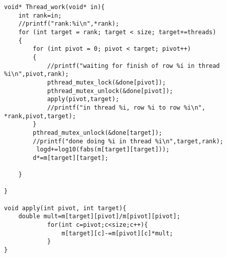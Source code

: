 \documentclass{article}
\begin{document}
\begin{lstlisting}[style=CStyle]
void* Thread_work(void* in){
    int rank=in;
    //printf("rank:%i\n",*rank);
    for (int target = rank; target < size; target+=threads)
    {
        for (int pivot = 0; pivot < target; pivot++)
        {
            //printf("waiting for finish of row %i in thread %i\n",pivot,rank);
            pthread_mutex_lock(&done[pivot]);
            pthread_mutex_unlock(&done[pivot]);
            apply(pivot,target);
            //printf("in thread %i, row %i to row %i\n", *rank,pivot,target);
        }
        pthread_mutex_unlock(&done[target]);
        //printf("done doing %i in thread %i\n",target,rank);
         logd+=log10(fabs(m[target][target]));
        d*=m[target][target];
        
    }

}

void apply(int pivot, int target){
    double mult=m[target][pivot]/m[pivot][pivot];
            for(int c=pivot;c<size;c++){
                m[target][c]-=m[pivot][c]*mult;
            }
}
\end{lstlisting}

\end{document}
